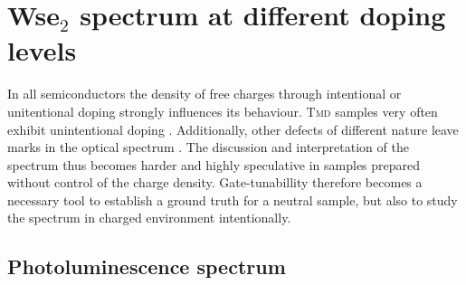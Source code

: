 \section{Ws\textup{e}$_2$ spectrum at different doping levels}

In all semiconductors the density of free charges through intentional or unitentional doping strongly influences its behaviour. \textsc{Tmd} samples very often exhibit unintentional doping \cite{kang_origin_2017, eshun_doping_2015}. Additionally, other defects of different nature leave marks in the optical spectrum  \cite{chow_defect-induced_2015,lin_defect_2016}. The discussion and interpretation of the spectrum thus becomes harder and highly speculative in samples prepared without control of the charge density. Gate-tunabillity therefore becomes a necessary tool to establish a ground truth for a neutral sample, but also to study the spectrum in charged environment intentionally.

\subsection{Photoluminescence spectrum}

